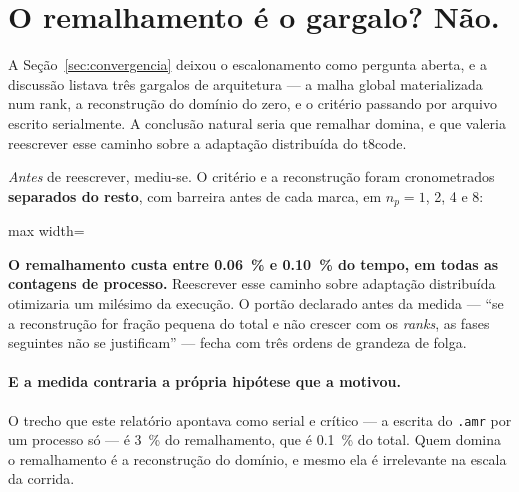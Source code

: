 \section{O remalhamento \'e o gargalo? N\~ao.}
\label{sec:fase0}

A Se\c{c}\~ao~\ref{sec:convergencia} deixou o escalonamento como pergunta aberta,
e a discuss\~ao listava tr\^es gargalos de arquitetura --- a malha global
materializada num rank, a reconstru\c{c}\~ao do dom\'inio do zero, e o crit\'erio
passando por arquivo escrito serialmente. A conclus\~ao natural seria que
remalhar domina, e que valeria reescrever esse caminho sobre a adapta\c{c}\~ao
distribu\'ida do t8code.

\emph{Antes} de reescrever, mediu-se. O crit\'erio e a reconstru\c{c}\~ao foram
cronometrados \textbf{separados do resto}, com barreira antes de cada marca, em
$n_p = 1$, 2, 4 e 8:

\begin{adjustbox}{max width=\linewidth}
\end{adjustbox}

\textbf{O remalhamento custa entre \SI{0.06}{\percent} e \SI{0.10}{\percent} do
tempo, em todas as contagens de processo.} Reescrever esse caminho sobre
adapta\c{c}\~ao distribu\'ida otimizaria um mil\'esimo da execu\c{c}\~ao. O
port\~ao declarado antes da medida --- ``se a reconstru\c{c}\~ao for fra\c{c}\~ao
pequena do total e n\~ao crescer com os \emph{ranks}, as fases seguintes n\~ao se
justificam'' --- fecha com tr\^es ordens de grandeza de folga.

\paragraph{E a medida contraria a pr\'opria hip\'otese que a motivou.} O trecho
que este relat\'orio apontava como serial e cr\'itico --- a escrita do
\texttt{.amr} por um processo s\'o --- \'e \SI{3}{\percent} do remalhamento, que
\'e \SI{0.1}{\percent} do total. Quem domina o remalhamento \'e a
reconstru\c{c}\~ao do dom\'inio, e mesmo ela \'e irrelevante na escala da corrida.

